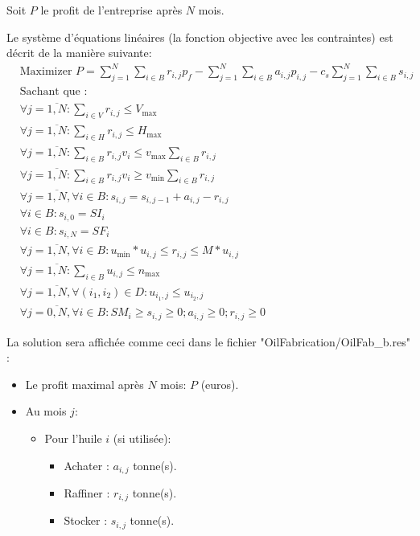 \documentclass[10pt,a4paper]{article}
\begin{document}
Soit $P$ le profit de l'entreprise après $N$ mois.

Le système d'équations linéaires (la fonction objective avec les contraintes) est décrit de la manière suivante:
\begin{align*}
    & \text{Maximizer } P = \sum\limits_{j = 1}^N {\sum\limits_{i \in B}^{} {{r_{i,j}}p_f} }  - \sum\limits_{j = 1}^N {\sum\limits_{i \in B}^{} {{a_{i,j}}{p_{i,j}}} }  - {c_s}\sum\limits_{j = 1}^N {\sum\limits_{i \in B}^{} {{s_{i,j}}} }\\
    & \text{Sachant que : }\\
    & \forall j = \overline {1,N} :\sum\limits_{i \in V}^{} {{r_{i,j}}}  \le {V_{\max }}\\
    & \forall j = \overline {1,N} :\sum\limits_{i \in H}^{} {{r_{i,j}}}  \le {H_{\max }}\\
    & \forall j = \overline {1,N} :\sum\limits_{i \in B}^{} {{r_{i,j}}{v_i}}  \le {v_{\max }}\sum\limits_{i \in B}^{} {{r_{i,j}}} \\
    & \forall j = \overline {1,N} :\sum\limits_{i \in B}^{} {{r_{i,j}}{v_i}}  \ge {v_{\min }}\sum\limits_{i \in B}^{} {{r_{i,j}}} \\
    & \forall j = \overline {1,N} ,\forall i \in B:{s_{i,j}} = {s_{i,j - 1}} + {a_{i,j}} - {r_{i,j}}\\
    & \forall i \in B:{s_{i,0}} = {SI_i}\\
    & \forall i \in B:{s_{i,N}} = {SF_i}\\
    & \forall j = \overline {1,N} ,\forall i \in B:{u_{\min }}*{u_{i,j}} \le {r_{i,j}} \le M*{u_{i,j}}\\
    & \forall j = \overline {1,N} :\sum\limits_{i \in B}^{} {{u_{i,j}}}  \le {n_{\max }}\\
    & \forall j = \overline {1,N} ,\forall \left( {{i_1},{i_2}} \right) \in D:{u_{{i_1},j}} \le {u_{{i_2},j}}\\
    & \forall j = \overline {0,N} ,\forall i \in B:S{M_i} \ge {s_{i,j}} \ge 0;{a_{i,j}} \ge 0;{r_{i,j}} \ge 0
\end{align*}

La solution sera affichée comme ceci dans le fichier
"OilFabrication/OilFab\_{}b.res" :
\begin{itemize}
    \item Le profit maximal après $N$ mois: $P$ (euros).
    \item Au mois $j$:
    \begin{itemize}
        \item Pour l'huile $i$ (si utilisée):
        \begin{itemize}
            \item Achater : $a_{i,j}$ tonne(s).
            \item Raffiner : $r_{i,j}$ tonne(s).
            \item Stocker : $s_{i,j}$ tonne(s).
        \end{itemize}
    \end{itemize}
\end{itemize}
\end{document}
